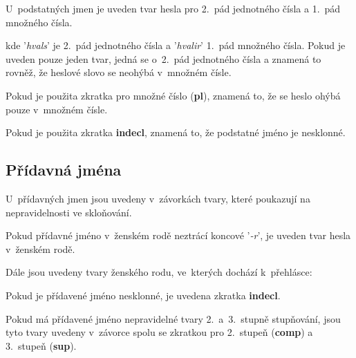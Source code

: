 U~podstatných jmen je uveden tvar hesla pro 2.~pád jednotného čísla a 1.~pád množného čísla.

\blspace
  \dicEntry {}  
\blspace

kde '\textit{hvals}' je 2.~pád jednotného čísla a '\textit{hvalir}' 1.~pád množného čísla.
Pokud je uveden pouze jeden tvar, jedná se o~2.~pád jednotného čísla a znamená to rovněž, že heslové slovo se neohýbá v~množném čísle.

\blspace
  \dicEntry {}  
\blspace

Pokud je použita zkratka pro množné číslo (\textbf{pl}), znamená to, že se heslo ohýbá pouze v~množném čísle.

\blspace
  \dicEntry {}  
\blspace

Pokud je použita zkratka \textbf{indecl}, znamená to, že podstatné jméno je nesklonné.

\blspace
  \dicEntry {}  
\blspace

\subsection*{Přídavná jména}

U~přídavných jmen jsou uvedeny v~závorkách tvary, které poukazují na nepravidelnosti ve skloňování.

Pokud přídavné jméno v~ženském rodě neztrácí koncové '\textit{-r}', je uveden tvar hesla v~ženském rodě.

\blspace
  \dicEntry {}  
\blspace

Dále jsou uvedeny tvary ženského rodu, ve~kterých dochází k~přehlásce:

\blspace
  \dicEntry {}  
\blspace

Pokud je přídavené jméno nesklonné, je uvedena zkratka \textbf{indecl}.

\blspace
  \dicEntry {}  
\blspace

Pokud má přídavené jméno nepravidelné tvary 2.~a~3.~stupně stupňování, jsou tyto tvary uvedeny v~závorce spolu se zkratkou pro 2.~stupeň (\textbf{comp}) a 3.~stupeň (\textbf{sup}).

\blspace
  \dicEntry {}  
\blspace

